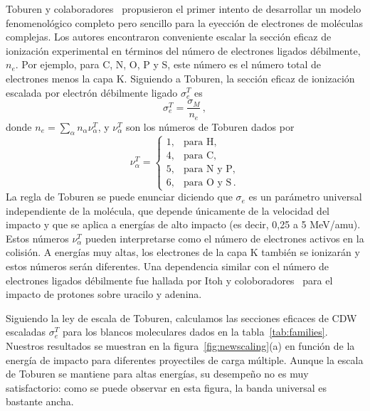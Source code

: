 Toburen y colaboradores~\cite{toburen1975,toburen1976} propusieron el 
primer intento de desarrollar un modelo fenomenológico completo pero 
sencillo para la eyección de electrones de moléculas complejas. Los 
autores encontraron conveniente escalar la sección eficaz de ionización 
experimental en términos del número de electrones ligados débilmente, $n_e$.
Por ejemplo, para C, N, O, P y S, este número es el número total de 
electrones menos la capa K. Siguiendo a Toburen, la sección eficaz de 
ionización escalada por electrón débilmente ligado $\sigma_{e}^T$ es
\begin{equation}
\sigma_{e}^T=\frac{\sigma_{M}}{n_e}\,, 
\label{27} 
\end{equation}
donde $n_e=\sum_{\alpha}n_{\alpha}\nu_{\alpha}^T$, y $\nu_{\alpha}^T$ 
son los números de Toburen dados por
\begin{equation}
\nu_{\alpha}^T=\left\{ 
\begin{array}{ll}
1, & \text{para H,} \\
4, & \text{para C,} \\ 
5, & \text{para N y P,} \\ 
6, & \text{para O y S}\,.
\end{array}\right.
\label{eq:nelec} 
\end{equation} 
La regla de Toburen se puede enunciar diciendo que $\sigma_{e}$ es un 
parámetro universal independiente de la molécula, que depende únicamente 
de la velocidad del impacto y que se aplica a energías de alto impacto 
(es decir, 0,25 a 5 MeV/amu). Estos números $\nu_{\alpha}^T$ pueden 
interpretarse como el número de electrones activos en la colisión. A 
energías muy altas, los electrones de la capa K también se ionizarán y 
estos números serán diferentes. Una dependencia similar con el número de 
electrones ligados débilmente fue hallada por Itoh y 
coloboradores~\cite{itoh2013} para el impacto de protones sobre uracilo 
y adenina.

Siguiendo la ley de escala de Toburen, calculamos las secciones eficaces 
de CDW escaladas $\sigma_{e}^T$ para los blancos moleculares dados en la
tabla~\ref{tab:families}. Nuestros resultados se muestran en la 
figura~\ref{fig:newscaling}(a) en función de la energía de impacto para 
diferentes proyectiles de carga múltiple. Aunque la escala de Toburen 
se mantiene para altas energías, su desempeño no es muy satisfactorio: 
como se puede observar en esta figura, la banda universal es bastante 
ancha.



